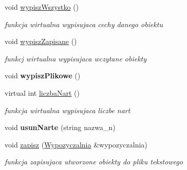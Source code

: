 \begin{DoxyCompactItemize}
\item 
\mbox{\label{class_wypozyczalnia_a09beac2dbecfae112a9ea873485218bd}} 
void \hyperlink{class_wypozyczalnia_a09beac2dbecfae112a9ea873485218bd}{wypisz\+Wszystko} ()
\begin{DoxyCompactList}\small\item\em funkcja wirtualna wypisujaca cechy danego obiektu \end{DoxyCompactList}\item 
\mbox{\label{class_wypozyczalnia_a266db1f7c31b5856e6e59428701bdd5d}} 
void \hyperlink{class_wypozyczalnia_a266db1f7c31b5856e6e59428701bdd5d}{wypisz\+Zapisane} ()
\begin{DoxyCompactList}\small\item\em funkcj wirtualna wypisujaca wczytane obiekty \end{DoxyCompactList}\item 
\mbox{\label{class_wypozyczalnia_a68d06aa42ef2f21fd8ebedb4bea9bccd}} 
void {\bfseries wypisz\+Plikowe} ()
\item 
\mbox{\label{class_wypozyczalnia_a47b50362048a34c2be7de80d9fc79b26}} 
virtual int \hyperlink{class_wypozyczalnia_a47b50362048a34c2be7de80d9fc79b26}{liczba\+Nart} ()
\begin{DoxyCompactList}\small\item\em funkcja wirtualna wypisujaca liczbe nart \end{DoxyCompactList}\item 
\mbox{\label{class_wypozyczalnia_a23adfc6602609355a82a9597b6e27d14}} 
void {\bfseries usun\+Narte} (string nazwa\+\_\+n)
\item 
\mbox{\label{class_wypozyczalnia_a175f9f59c4b89eaf83cecf41d445cf45}} 
void \hyperlink{class_wypozyczalnia_a175f9f59c4b89eaf83cecf41d445cf45}{zapisz} (\hyperlink{class_wypozyczalnia}{Wypozyczalnia} \&wypozyczalnia)
\begin{DoxyCompactList}\small\item\em funkcja zapisujaca utworzone obiekty do pliku tekstowego \end{DoxyCompactList}\item 
\mbox{\label{class_wypozyczalnia_a962569bfd0e3f5c8a88facf5494134ac}} 

\end{DoxyCompactItemize}
